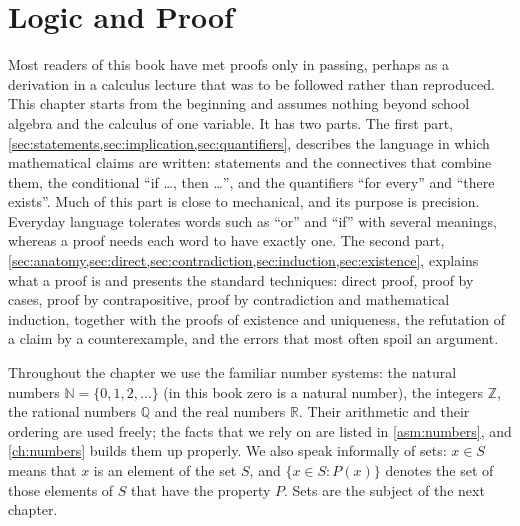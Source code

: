 \chapter{Logic and Proof}
\label{ch:logic}


Most readers of this book have met proofs only in passing, perhaps as a derivation in a calculus lecture that was to be followed rather than reproduced. This chapter starts from the beginning and assumes nothing beyond school algebra and the calculus of one variable. It has two parts. The first part, \cref{sec:statements,sec:implication,sec:quantifiers}, describes the language in which mathematical claims are written: statements and the connectives that combine them, the conditional ``if \ldots, then \ldots'', and the quantifiers ``for every'' and ``there exists''. Much of this part is close to mechanical, and its purpose is precision. Everyday language tolerates words such as ``or'' and ``if'' with several meanings, whereas a proof needs each word to have exactly one. The second part, \cref{sec:anatomy,sec:direct,sec:contradiction,sec:induction,sec:existence}, explains what a proof is and presents the standard techniques: direct proof, proof by cases, proof by contrapositive, proof by contradiction and mathematical induction, together with the proofs of existence and uniqueness, the refutation of a claim by a counterexample, and the errors that most often spoil an argument.

Throughout the chapter we use the familiar number systems: the natural numbers $\mathbb N=\{0,1,2,\ldots\}$ (in this book zero is a natural number), the integers $\mathbb Z$, the rational numbers $\mathbb Q$ and the real numbers $\mathbb R$. Their arithmetic and their ordering are used freely; the facts that we rely on are listed in \cref{asm:numbers}, and \cref{ch:numbers} builds them up properly. We also speak informally of sets: $x\in S$ means that $x$ is an element of the set $S$, and $\{x\in S: P(x)\}$ denotes the set of those elements of $S$ that have the property $P$. Sets are the subject of the next chapter.

